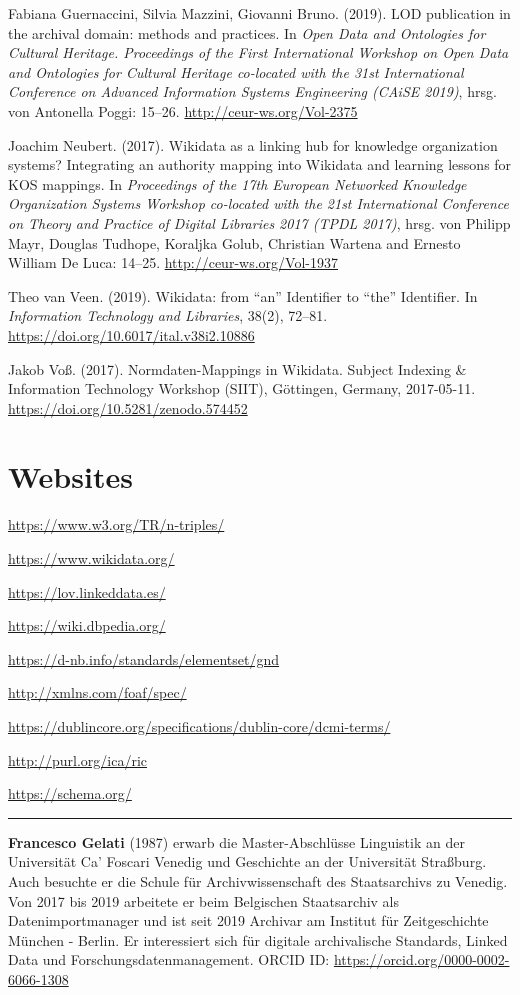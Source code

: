 \documentclass[a4paper,
fontsize=11pt,
oneside,
numbers=noperiodatend,
parskip=half-,
bibliography=totoc,
final
]{scrartcl}
\begin{document}
Fabiana Guernaccini, Silvia Mazzini, Giovanni Bruno. (2019). LOD
publication in the archival domain: methods and practices. In \emph{Open
Data and Ontologies for Cultural Heritage. Proceedings of the First
International Workshop on Open Data and Ontologies for Cultural Heritage
co-located with the 31st International Conference on Advanced
Information Systems Engineering (CAiSE 2019)}, hrsg. von Antonella
Poggi: 15--26.
\href{http://ceur-ws.org/Vol-2375/}{http://ceur-ws.org/Vol-2375}

Joachim Neubert. (2017). Wikidata as a linking hub for knowledge
organization systems? Integrating an authority mapping into Wikidata and
learning lessons for KOS mappings. In \emph{Proceedings of the 17th
European Networked Knowledge Organization Systems Workshop co-located
with the 21st International Conference on Theory and Practice of Digital
Libraries 2017 (TPDL 2017)}, hrsg. von Philipp Mayr, Douglas Tudhope,
Koraljka Golub, Christian Wartena and Ernesto William De Luca: 14--25.
\url{http://ceur-ws.org/Vol-1937}

Theo van Veen. (2019). Wikidata: from \enquote{an} Identifier to
\enquote{the} Identifier. In \emph{Information Technology and
Libraries}, 38(2), 72--81.
\url{https://doi.org/10.6017/ital.v38i2.10886}

Jakob Voß. (2017). Normdaten-Mappings in Wikidata. Subject Indexing \&
Information Technology Workshop (SIIT), Göttingen, Germany, 2017-05-11.
\url{https://doi.org/10.5281/zenodo.574452}

\hypertarget{websites}{%
\section{Websites}\label{websites}}

\url{https://www.w3.org/TR/n-triples/}

\url{https://www.wikidata.org/}

\url{https://lov.linkeddata.es/}

\url{https://wiki.dbpedia.org/}

\url{https://d-nb.info/standards/elementset/gnd}

\url{http://xmlns.com/foaf/spec/}

\url{https://dublincore.org/specifications/dublin-core/dcmi-terms/}

\url{http://purl.org/ica/ric}

\url{https://schema.org/}

\begin{center}\rule{0.5\linewidth}{0.5pt}\end{center}

\textbf{Francesco Gelati} (1987) erwarb die Master-Abschlüsse Linguistik
an der Universität Ca' Foscari Venedig und Geschichte an der Universität
Straßburg. Auch besuchte er die Schule für Archivwissenschaft des
Staatsarchivs zu Venedig. Von 2017 bis 2019 arbeitete er beim Belgischen
Staatsarchiv als Datenimportmanager und ist seit 2019 Archivar am
Institut für Zeitgeschichte München - Berlin. Er interessiert sich für
digitale archivalische Standards, Linked Data und
Forschungsdatenmanagement. ORCID ID:
\url{https://orcid.org/0000-0002-6066-1308}
\end{document}
